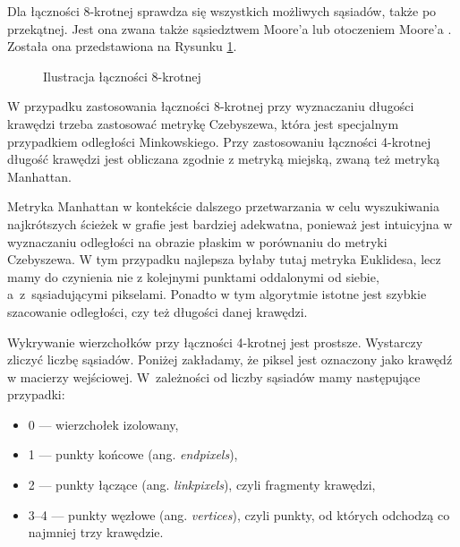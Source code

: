 \documentclass[a4paper,11pt,twoside,openright]{report}
\theoremstyle{definition}
\begin{document}
Dla łączności 8-krotnej sprawdza się wszystkich możliwych sąsiadów, także po
przekątnej. Jest ona zwana także sąsiedztwem Moore'a lub otoczeniem Moore'a \cite{Moore}.
Została ona przedstawiona na Rysunku \ref{fig:8pixel}.

\begin{figure}[h!]
\begin{center}
\end{center}
\caption{Ilustracja łączności 8-krotnej}
\label{fig:8pixel}
\end{figure}

W przypadku zastosowania łączności 8-krotnej przy wyznaczaniu długości krawędzi
trzeba zastosować metrykę Czebyszewa, która jest specjalnym przypadkiem
odległości Minkowskiego. Przy zastosowaniu łączności 4-krotnej długość krawędzi
jest obliczana zgodnie z metryką miejską, zwaną też metryką Manhattan.

Metryka Manhattan w kontekście dalszego przetwarzania w celu wyszukiwania
najkrótszych ścieżek w grafie jest bardziej adekwatna, ponieważ jest intuicyjna
w wyznaczaniu odległości na obrazie płaskim w porównaniu do metryki Czebyszewa.
W tym przypadku najlepsza byłaby tutaj metryka Euklidesa, lecz mamy do czynienia
nie z kolejnymi punktami oddalonymi od siebie, a~z~sąsiadującymi pikselami.
Ponadto w tym algorytmie istotne jest szybkie szacowanie odległości, czy też
długości danej krawędzi.

Wykrywanie wierzchołków przy łączności 4-krotnej jest prostsze. Wystarczy zliczyć
liczbę sąsiadów. Poniżej zakładamy, że piksel jest oznaczony jako krawędź w macierzy
wejściowej. W~zależności od liczby sąsiadów mamy następujące przypadki:
\begin{itemize}[noitemsep]
\item 0 --- wierzchołek izolowany,
\item 1 --- punkty końcowe (ang. \textit{endpixels}),
\item 2 --- punkty łączące (ang. \textit{linkpixels}), czyli fragmenty krawędzi,
\item 3--4 --- punkty węzłowe (ang. \textit{vertices}), czyli punkty, od których odchodzą
co najmniej trzy krawędzie.
\end{itemize}
\end{document}
